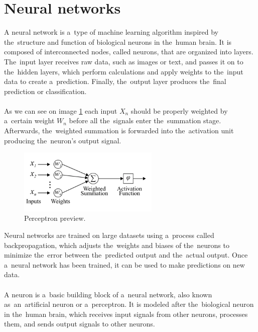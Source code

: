    \section{Neural networks} \label{sec:nn}
    A neural network is a~type of machine learning algorithm inspired by the~structure and function of biological neurons in the~human brain. It is composed of interconnected nodes, called neurons, that are organized into layers. The~input layer receives raw data, such as images or text, and passes it on to the~hidden layers, which perform calculations and apply weights to the~input data to create a~prediction. Finally, the~output layer produces the~final prediction or classification.\\
    \\
    As we can see on image \ref{fig:perceptron} each input $X_n$ should be properly weighted by a~certain weight $W_n$ before all the~signals enter the~summation stage. Afterwards, the~weighted summation is forwarded into the~activation unit producing the~neuron’s output signal.
    \begin{center}
        \begin{figure}[!ht]
            \centering
            \includegraphics[width=0.6\textwidth]{figures/nn}
            \caption{Perceptron preview. \cite{Mourgias-Alexandris:19}}
            \label{fig:perceptron}
        \end{figure}
    \end{center}
    Neural networks are trained on large datasets using a~process called backpropagation, which adjusts the~weights and biases of the~neurons to minimize the~error between the~predicted output and the~actual output. Once a~neural network has been trained, it can be used to make predictions on new data.\\
    \\
    A neuron is a~basic building block of a~neural network, also known as~an~artificial neuron or a~perceptron.
It is modeled after the~biological neuron in the~human brain, which receives input signals from other neurons,
processes them, and sends output signals to other neurons.\\
